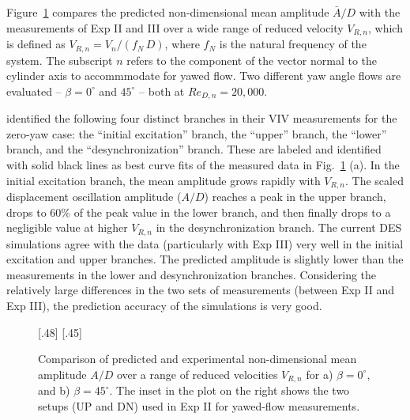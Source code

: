 Figure~\ref{fig:Amplitude_VIV} compares the predicted non-dimensional
mean amplitude $\bar{A}/D$ with the measurements of Exp II and III over a wide
range of reduced velocity $V_{R,n}$, which is defined as
$V_{R,n}=V_n/(f_N\,D)$, where $f_N$ is the natural frequency of the system. The
subscript $n$ refers to the component of the vector normal to the cylinder axis
to accommmodate for yawed flow. Two different yaw angle flows are evaluated --
$\beta=0^\circ$ and $45^\circ$ -- both at $Re_{D,n}=20,000$.

\citet{khalak1997fluid} identified the following four distinct branches in
their VIV measurements for the zero-yaw case: the ``initial excitation''
branch, the ``upper'' branch, the ``lower'' branch, and the
``desynchronization'' branch. These are labeled and identified with solid black
lines as best curve fits of the measured data in Fig.~\ref{fig:Amplitude_VIV}
(a). In the initial excitation branch, the mean amplitude grows rapidly with
$V_{R,n}$. The scaled displacement oscillation amplitude ($A/D$) reaches a peak
in the upper branch, drops to 60\% of the peak value in the lower branch, and
then finally drops to a negligible value at higher $V_{R,n}$ in the
desynchronization branch. The current DES simulations agree with the data
(particularly with Exp III) very well in the initial excitation and upper
branches. The predicted amplitude is slightly lower than the measurements in
the lower and desynchronization branches. Considering the relatively large
differences in the two sets of measurements (between Exp II and Exp III), the
prediction accuracy of the simulations is very good.
%
\begin{figure}[htb!]
  \centering
    [.48\linewidth]{}
  \hspace*{\fill}
    [.45\linewidth]{}
    \caption{Comparison of predicted and experimental non-dimensional mean
      amplitude $A/D$ over a range of reduced velocities $V_{R,n}$ for a)
      $\beta=0^\circ$, and b) $\beta=45^\circ$. The inset in the plot on the right
      shows the two setups (UP and DN) used in Exp II for yawed-flow
      measurements.} 
  \label{fig:Amplitude_VIV}
\end{figure}

